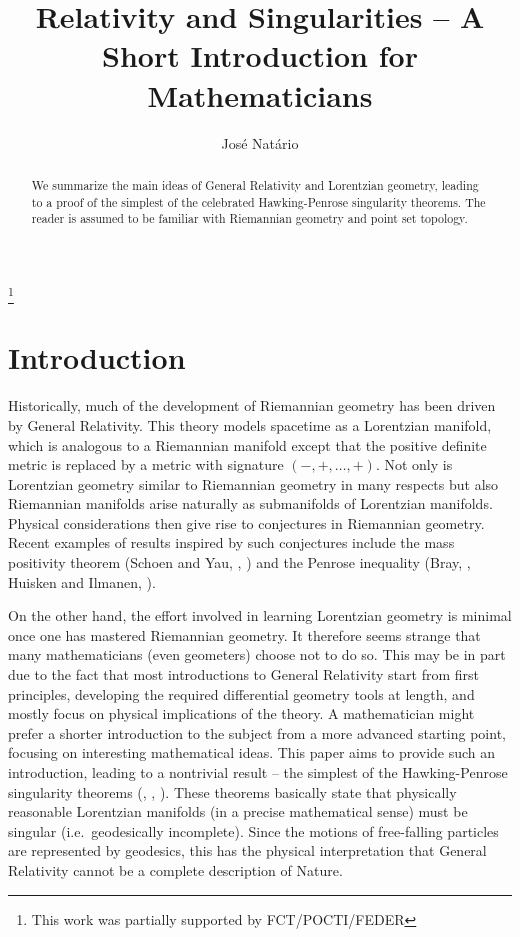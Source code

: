 \documentclass[10pt]{amsart}
\theoremstyle{definition}
\theoremstyle{remark}
\begin{document}
%
%
\begin{abstract}
We summarize the main ideas of General Relativity and Lorentzian geometry, leading to a proof of the simplest of the celebrated Hawking-Penrose singularity theorems. The reader is assumed to be familiar with Riemannian geometry and point set topology.
\end{abstract}
%
%
\title[Relativity and Singularities]{Relativity and Singularities -- A Short Introduction for Mathematicians}
%
\author{Jos\'{e} Nat\'{a}rio}
\address{Department of Mathematics, Instituto Superior T\'{e}cnico, Portugal}
\thanks{This work was partially supported by FCT/POCTI/FEDER}
%
%
\maketitle
%
%
%
\section*{Introduction}
%
Historically, much of the development of Riemannian geometry has been driven by General Relativity. This theory models spacetime as a Lorentzian manifold, which is analogous to a Riemannian manifold except that the positive definite metric is replaced by a metric with signature $(-,+, \ldots, +)$. Not only is Lorentzian geometry similar to Riemannian geometry in many respects but also Riemannian manifolds arise naturally as submanifolds of Lorentzian manifolds. Physical considerations then give rise to conjectures in Riemannian geometry. Recent examples of results inspired by such conjectures include the mass positivity theorem (Schoen and Yau, \cite{SY79}, \cite{SY81}) and the Penrose inequality (Bray, \cite{B01}, Huisken and Ilmanen, \cite{HI01}).

On the other hand, the effort involved in learning Lorentzian geometry is minimal once one has mastered Riemannian geometry. It therefore seems strange that many mathematicians (even geometers) choose not to do so. This may be in part due to the fact that most introductions to General Relativity start from first principles, developing the required differential geometry tools at length, and mostly focus on physical implications of the theory. A mathematician might prefer a shorter introduction to the subject from a more advanced starting point, focusing on interesting mathematical ideas. This paper aims to provide such an introduction, leading to a nontrivial result -- the simplest of the Hawking-Penrose singularity theorems (\cite{P65}, \cite{H67}, \cite{HP70}). These theorems basically state that physically reasonable Lorentzian manifolds (in a precise mathematical sense) must be singular (i.e.~geodesically incomplete). Since the motions of free-falling particles are represented by geodesics, this has the physical interpretation that General Relativity cannot be a complete description of Nature.
\end{document}
